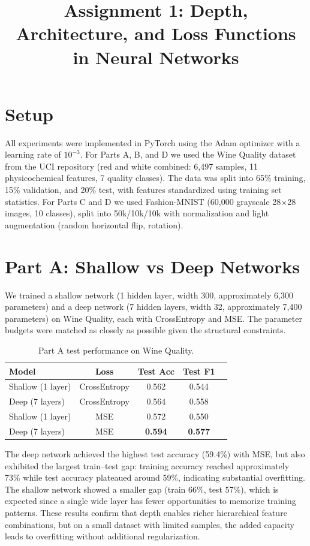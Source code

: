 \documentclass[11pt,a4paper]{article}
\title{Assignment 1: Depth, Architecture, and Loss Functions in Neural Networks}
\author{}
\date{}
\begin{document}
\maketitle
\vspace{-1.5cm}

\section{Setup}

All experiments were implemented in PyTorch using the Adam optimizer with a learning rate of $10^{-3}$. For Parts A, B, and D we used the Wine Quality dataset from the UCI repository (red and white combined: 6{,}497 samples, 11 physicochemical features, 7 quality classes). The data was split into 65\% training, 15\% validation, and 20\% test, with features standardized using training set statistics. For Parts C and D we used Fashion-MNIST (60{,}000 grayscale 28$\times$28 images, 10 classes), split into 50k/10k/10k with normalization and light augmentation (random horizontal flip, rotation).

\section{Part A: Shallow vs Deep Networks}

We trained a shallow network (1 hidden layer, width 300, approximately 6{,}300 parameters) and a deep network (7 hidden layers, width 32, approximately 7{,}400 parameters) on Wine Quality, each with CrossEntropy and MSE. The parameter budgets were matched as closely as possible given the structural constraints.

\begin{table}[H]
\centering
\begin{tabular}{lcccc}
\toprule
Model & Loss & Test Acc & Test F1 \\
\midrule
Shallow (1 layer) & CrossEntropy & 0.562 & 0.544 \\
Deep (7 layers) & CrossEntropy & 0.564 & 0.558 \\
Shallow (1 layer) & MSE & 0.572 & 0.550 \\
Deep (7 layers) & MSE & \textbf{0.594} & \textbf{0.577} \\
\bottomrule
\end{tabular}
\caption{Part A test performance on Wine Quality.}
\end{table}

The deep network achieved the highest test accuracy (59.4\%) with MSE, but also exhibited the largest train--test gap: training accuracy reached approximately 73\% while test accuracy plateaued around 59\%, indicating substantial overfitting. The shallow network showed a smaller gap (train 66\%, test 57\%), which is expected since a single wide layer has fewer opportunities to memorize training patterns. These results confirm that depth enables richer hierarchical feature combinations, but on a small dataset with limited samples, the added capacity leads to overfitting without additional regularization.
\end{document}
